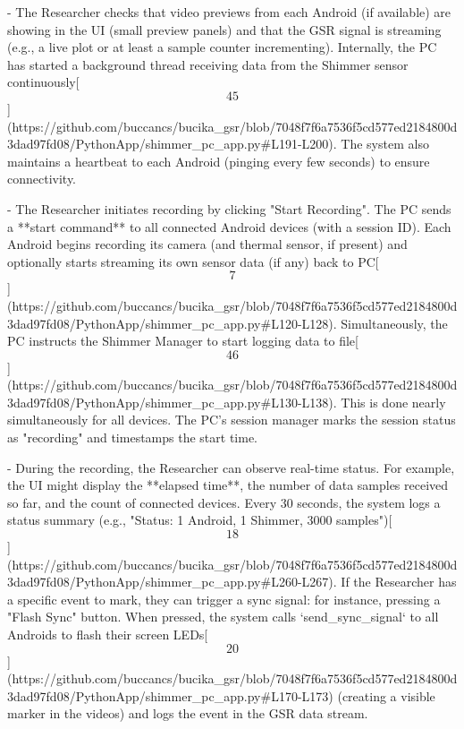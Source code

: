 \documentclass[12pt,a4paper]{article}
\begin{document}
- The Researcher checks that video previews from each Android (if
  available) are showing in the UI (small preview panels) and that the
  GSR signal is streaming (e.g., a live plot or at least a sample
  counter incrementing). Internally, the PC has started a background
  thread receiving data from the Shimmer sensor
  continuously[\[45\]](https://github.com/buccancs/bucika_gsr/blob/7048f7f6a7536f5cd577ed2184800d3dad97fd08/PythonApp/shimmer_pc_app.py#L191-L200).
  The system also maintains a heartbeat to each Android (pinging every
  few seconds) to ensure connectivity.

- The Researcher initiates recording by clicking "Start Recording". The
  PC sends a **start command** to all connected Android devices (with a
  session ID). Each Android begins recording its camera (and thermal
  sensor, if present) and optionally starts streaming its own sensor
  data (if any) back to
  PC[\[7\]](https://github.com/buccancs/bucika_gsr/blob/7048f7f6a7536f5cd577ed2184800d3dad97fd08/PythonApp/shimmer_pc_app.py#L120-L128).
  Simultaneously, the PC instructs the Shimmer Manager to start logging
  data to
  file[\[46\]](https://github.com/buccancs/bucika_gsr/blob/7048f7f6a7536f5cd577ed2184800d3dad97fd08/PythonApp/shimmer_pc_app.py#L130-L138).
  This is done nearly simultaneously for all devices. The PC's session
  manager marks the session status as "recording" and timestamps the
  start time.

- During the recording, the Researcher can observe real-time status. For
  example, the UI might display the **elapsed time**, the number of data
  samples received so far, and the count of connected devices. Every 30
  seconds, the system logs a status summary (e.g., "Status: 1 Android, 1
  Shimmer, 3000
  samples")[\[18\]](https://github.com/buccancs/bucika_gsr/blob/7048f7f6a7536f5cd577ed2184800d3dad97fd08/PythonApp/shimmer_pc_app.py#L260-L267).
  If the Researcher has a specific event to mark, they can trigger a
  sync signal: for instance, pressing a "Flash Sync" button. When
  pressed, the system calls `send_sync_signal` to all Androids to flash
  their screen
  LEDs[\[20\]](https://github.com/buccancs/bucika_gsr/blob/7048f7f6a7536f5cd577ed2184800d3dad97fd08/PythonApp/shimmer_pc_app.py#L170-L173)
  (creating a visible marker in the videos) and logs the event in the
  GSR data stream.
\end{document}

